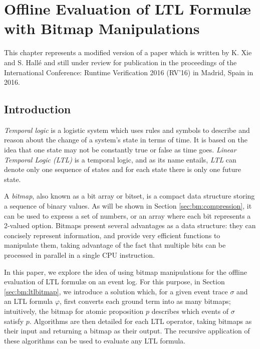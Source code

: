 
\chapter{Offline Evaluation of LTL Formulæ with Bitmap Manipulations}

This chapter represents a modified version of a paper which is written by K. Xie and S. Hallé and still under review for publication in the proceedings of the International Conference: Runtime Verification 2016 (RV'16) in Madrid, Spain in 2016.

\section{Introduction}\label{sec:bm:intro} %

\emph{Temporal logic} \cite{huth2004} is a logistic system which uses rules and symbols to describe and reason about the change of a system's state in terms of time. It is based on the idea that one state may not be constantly true or false as time goes. \emph{Linear Temporal Logic (LTL)} \citep{pnueli97} is a temporal logic, and as its name entails, \emph{LTL} can denote only one sequence of states and for each state there is only one future state.

A \emph{bitmap}, also known as a bit array or bitset, is a compact data structure storing a sequence of binary values. As will be shown in Section \ref{sec:bm:compression}, it can be used to express a set of numbers, or an array where each bit represents a 2-valued option. Bitmaps present several advantages as a data structure: they can concisely represent information, and provide very efficient functions to manipulate them, taking advantage of the fact that multiple bits can be processed in parallel in a single CPU instruction.

In this paper, we explore the idea of using bitmap manipulations for the offline evaluation of LTL formul\ae{} on an event log. For this purpose, in Section \ref{sec:bm:ltlbitmap}, we introduce a solution which, for a given event trace $\sigma$ and an LTL formula $\varphi$, first converts each ground term into as many bitmaps; intuitively, the bitmap for atomic proposition $p$ describes which events of $\sigma$ satisfy $p$. Algorithms are then detailed for each LTL operator, taking bitmaps as their input and returning a bitmap as their output. The recursive application of these algorithms can be used to evaluate any LTL formula.

